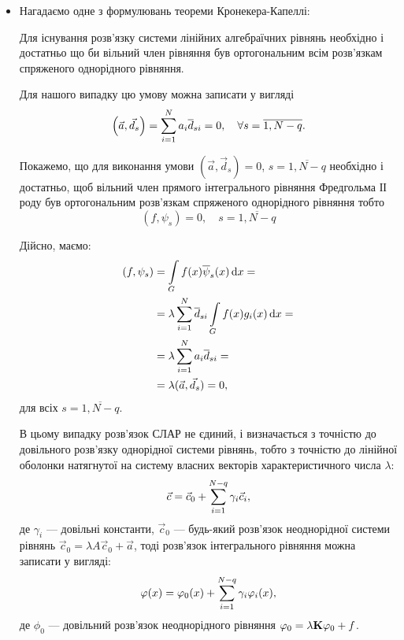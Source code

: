 \begin{itemize}
	\item Нагадаємо одне з формулювань теореми Кронекера-Капеллі: 
	\begin{theorem}
		Для існування розв'язку системи лінійних алгебраїчних рівнянь необхідно і достатньо що би вільний член рівняння був ортогональним всім розв'язкам спряженого однорідного рівняння.
	\end{theorem}

	Для нашого випадку цю умову можна записати у вигляді
	\begin{equation}
		\left(\vec a, \vec d_s\right) = \Sum_{i = 1}^N a_i \overline d_{si} = 0, \quad \forall s = \overline{1, N - q}.
	\end{equation}

	Покажемо, що для виконання умови $\left(\vec a, \vec d_s\right) = 0$, $s = \overline{1, N - q}$ необхідно і достатньо, щоб вільний член прямого інтегрального рівняння Фредгольма ІІ роду був ортогональним розв'язкам спряженого однорідного рівняння тобто 
	\begin{equation}
		(f, \psi_s) = 0, \quad s = \overline{1, N - q}
	\end{equation}

	Дійсно, маємо:
	\begin{equation}
		\begin{aligned}
		(f, \psi_s) &= \Int_G f(x) \overline \psi_s (x) \diff x = \\
		&= \lambda \Sum_{i = 1}^N \overline d_{si} \Int_G f(x) g_i(x) \diff x = \\ 
		&= \lambda \Sum_{i = 1}^N a_i \overline d_{si} = \\
		&= \lambda (\vec a, \vec d_s) = 0,
		\end{aligned}
	\end{equation}
	для всіх $s = \overline{1, N - q}$. \medskip

	В цьому випадку розв'язок СЛАР не єдиний, і визначається з точністю до довільного розв'язку однорідної системи рівнянь, тобто з точністю до лінійної оболонки натягнутої на систему власних векторів характеристичного числа $\lambda$:
	\begin{equation}
		\vec c = \vec c_0 + \Sum_{i = 1}^{N - q} \gamma_i \vec c_i,
	\end{equation}
	де $\gamma_i$ --- довільні константи, $\vec c_0$ --- будь-який розв'язок неоднорідної системи рівнянь $\vec c_0 = \lambda A \vec c_0 + \vec a$, тоді розв'язок інтегрального рівняння можна записати у вигляді:
	\begin{equation}
		\phi(x) = \phi_0(x) + \Sum_{i = 1}^{N - q} \gamma_i \phi_i(x),
	\end{equation}
	де $\phi_0$ --- довільний розв'язок неоднорідного рівняння $\phi_0 = \lambda \bf{K} \phi_0 + f$.
\end{itemize}


